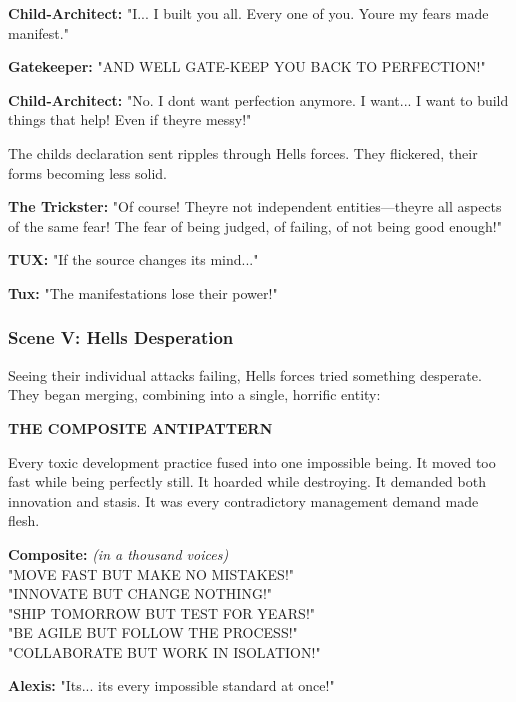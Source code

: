 \textbf{Child-Architect:} "I... I built you all. Every one of you. You\textquotesingle re my fears made manifest."

\textbf{Gatekeeper:} "AND WE\textquotesingle LL GATE-KEEP YOU BACK TO PERFECTION!"

\textbf{Child-Architect:} "No. I don\textquotesingle t want perfection anymore. I want... I want to build things that help! Even if they\textquotesingle re messy!"

The child\textquotesingle s declaration sent ripples through Hell\textquotesingle s forces. They flickered, their forms becoming less solid.

\textbf{The Trickster:} "Of course! They\textquotesingle re not independent entities---they\textquotesingle re all aspects of the same fear! The fear of being judged, of failing, of not being good enough!"

\textbf{TUX:} "If the source changes its mind..."

\textbf{Tux:} "The manifestations lose their power!"

\bookdivider

\subsubsection{Scene V: Hell\textquotesingle s Desperation}\label{scene-v-hells-desperation}

Seeing their individual attacks failing, Hell\textquotesingle s forces tried something desperate. They began merging, combining into a single, horrific entity:

\textbf{THE COMPOSITE ANTIPATTERN}

Every toxic development practice fused into one impossible being. It moved too fast while being perfectly still. It hoarded while destroying. It demanded both innovation and stasis. It was every contradictory management demand made flesh.

\textbf{Composite:} \emph{(in a thousand voices)}\\
"MOVE FAST BUT MAKE NO MISTAKES!"\\
"INNOVATE BUT CHANGE NOTHING!"\\
"SHIP TOMORROW BUT TEST FOR YEARS!"\\
"BE AGILE BUT FOLLOW THE PROCESS!"\\
"COLLABORATE BUT WORK IN ISOLATION!"

\textbf{Alexis:} "It\textquotesingle s... it\textquotesingle s every impossible standard at once!"

